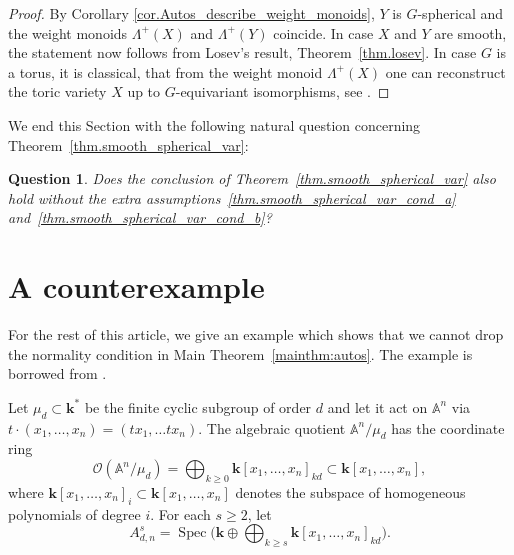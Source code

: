 \documentclass[JEP,XML,SOM,Unicode]{cedram}
\let\mathcal\mathscr
\theoremstyle{plain}
\newtheorem{question}[theorem]{Question}
\theoremstyle{definition}
\DeclareMathOperator{\Spec}{Spec}
\newcommand{\kk}{{\boldsymbol{k}}}
\newcommand{\name}[1]{#1}
\begin{document}
\begin{proof}
By Corollary \ref{cor.Autos_describe_weight_monoids}, $Y$ is $G$-spherical
and the weight monoids
$\Lambda^+(X)$ and $\Lambda^+(Y)$ coincide.
In case $X$ and $Y$ are smooth, the statement now follows from
\name{Losev}'s result, \ie Theorem~\ref{thm.losev}.
In case $G$ is a torus, it is classical, that from the weight monoid $\Lambda^+(X)$
one can reconstruct the toric variety $X$ up to $G$-equivariant isomorphisms,
see \eg \cite[\S1.3]{Fu1993Introduction-to-to}.
\end{proof}

We end this Section with the following natural question concerning
Theorem~\ref{thm.smooth_spherical_var}:

\begin{question}
Does the conclusion of Theorem~\ref{thm.smooth_spherical_var} also hold without
the extra assumptions~\eqref{thm.smooth_spherical_var_cond_a} and~\eqref{thm.smooth_spherical_var_cond_b}?
\end{question}

\section{A counterexample}
\label{sec.Counter_example}

For the rest of this article, we give an example which shows that we cannot drop the normality condition
in Main Theorem~\ref{mainthm:autos}. The example is borrowed from \cite{Re2017Characterization-o}.

Let $\mu_d \subset \kk^\ast$ be the
finite cyclic subgroup of order $d$ and let it act on $\mathbb{A}^n$ via
$t \cdot (x_1, \ldots, x_n) = (t x_1, \ldots t x_n)$. The algebraic quotient
$\mathbb{A}^n/\mu_d$ has the coordinate ring
\[
\mathcal{O}(\mathbb{A}^n/\mu_d) = \bigoplus_{k \ge 0} \kk[x_1,\dots,x_n]_{kd}
\subset \kk[x_1, \ldots, x_n],
\]
where
$\kk[x_1,\dots,x_n]_{i} \subset \kk[x_1, \ldots, x_n]$
denotes the subspace of homogeneous polynomials of degree $i$. For each $s \geq 2$, let
\[
A_{d, n}^s = \Spec\biggl(\kk \oplus \bigoplus_{k \ge s} \kk[x_1,\dots,x_n]_{kd} \biggr).
\]
\end{document}

